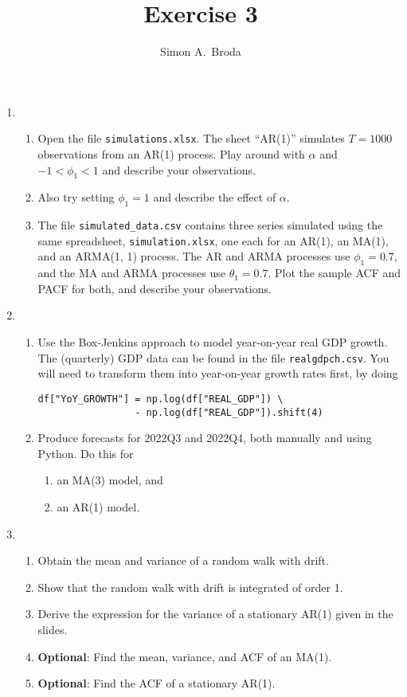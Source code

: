 \documentclass[11pt, a4paper]{article}
\begin{document}
\title{Exercise 3}
\author{Simon A.\ Broda}
\date{}
\maketitle

\begin{enumerate}
\item
\begin{enumerate}
\item Open the file \texttt{simulations.xlsx}. The sheet ``AR(1)'' simulates $T=1000$ observations from an AR(1) process. Play around with $\alpha$ and $-1<\phi_1<1$ and describe your observations.
\item Also try setting $\phi_1=1$ and describe the effect of $\alpha$.
\item The file \verb+simulated_data.csv+ contains three series simulated using the same spreadsheet, \texttt{simulation.xlsx}, one each for an AR(1), an MA(1), and an ARMA(1, 1) process. The AR and ARMA processes use $\phi_1=0.7$, and the MA and ARMA processes use $\theta_1=0.7$. Plot the sample ACF and PACF for both, and describe your observations.
\end{enumerate}
\item
\begin{enumerate}
\item Use the Box-Jenkins approach to model year-on-year real GDP growth. The (quarterly) GDP data can be found in the file \texttt{realgdpch.csv}. You will need to transform them into year-on-year growth rates first, by doing
\begin{verbatim}
df["YoY_GROWTH"] = np.log(df["REAL_GDP"]) \
                 - np.log(df["REAL_GDP"]).shift(4)
\end{verbatim}

\item Produce forecasts for 2022Q3 and 2022Q4, both manually and using Python. Do this for
\begin{enumerate}
	\item an MA(3) model, and
	\item an AR(1) model.
\end{enumerate}
\end{enumerate}
\item
\begin{enumerate}
\item Obtain the mean and variance of a random walk with drift.
\item Show that the random walk with drift is integrated of order 1.
\item Derive the expression for the variance of a stationary AR(1) given in the slides.
\item \textbf{Optional}: Find the mean, variance, and ACF of an MA(1).
\item \textbf{Optional}: Find the ACF of a stationary AR(1).
\end{enumerate}
\end{enumerate}
\end{document}
